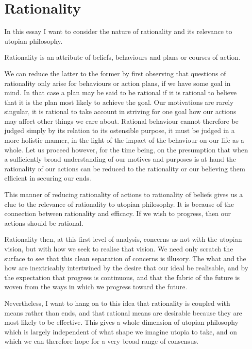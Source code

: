\chapter{Rationality}\label{Rationality}

In this essay I want to consider the nature of rationality and its relevance to utopian philosophy.

Rationality is an attribute of beliefs, behaviours and plans or courses of action.

We can reduce the latter to the former by first observing that questions of rationality only arise for behaviours or action plans, if we have some goal in mind.
In that case a plan may be said to be rational if it is rational to believe that it is the plan most likely to achieve the goal.
Our motivations are rarely singular, it is rational to take account in striving for one goal how our actions may affect other things we care about.
Rational behaviour cannot therefore be judged simply by its relation to its ostensible purpose, it must be judged in a more holistic manner, in the light of the impact of the behaviour on our life as a whole.
Let us proceed however, for the time being, on the presumption that when a sufficiently broad understanding of our motives and purposes is at hand the rationality of our actions can be reduced to the rationality or our believing them efficient in securing our ends.

This manner of reducing rationality of actions to rationality of beliefs gives us a clue to the relevance of rationality to utopian philosophy.
It is because of the connection between rationality and efficacy.
If we wish to progress, then our actions should be rational.

Rationality then, at this first level of analysis, concerns us not with the utopian vision, but with how we seek to realise that vision.
We need only scratch the surface to see that this clean separation of concerns is illusory.
The what and the how are inextricably intertwined by the desire that our ideal be realisable, and by the expectation that progress is continuous, and that the fabric of the future is woven from the ways in which we progress toward the future.

Nevertheless, I want to hang on to this idea that rationality is coupled with means rather than ends, and that rational means are desirable because they are most likely to be effective.
This gives a whole dimension of utopian philosophy which is largely independent of what shape we imagine utopia to take, and on which we can therefore hope for a very broad range of consensus.

